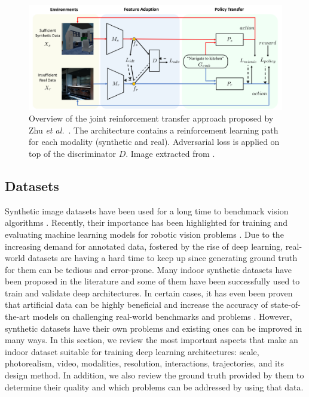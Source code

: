 \begin{figure}[!htb]
    \centering
    \includegraphics[width=\linewidth]{Figures/Sim2Real/jointlearning.png}
    \caption{Overview of the joint reinforcement transfer approach proposed by Zhu \emph{et al.}~\cite{Zhu2019}. The architecture contains a reinforcement learning path for each modality (synthetic and real). Adversarial loss is applied on top of the discriminator $D$. Image extracted from \cite{Zhu2019}.}
    \label{fig:sim2real:joint}
\end{figure}


\subsection{Datasets}

Synthetic image datasets have been used for a long time to benchmark vision algorithms \cite{Butler2012}. Recently, their importance has been highlighted for training and evaluating machine learning models for robotic vision problems \cite{Brodeur2017, Ros2016, Mahler2017dex}. Due to the increasing demand for annotated data, fostered by the rise of deep learning, real-world datasets are having a hard time to keep up since generating ground truth for them can be tedious and error-prone. Many indoor synthetic datasets have been proposed in the literature and some of them have been successfully used to train and validate deep architectures. In certain cases, it has even been proven that artificial data can be highly beneficial and increase the accuracy of state-of-the-art models on challenging real-world benchmarks and problems \cite{Shrivastava2017,Barbosa2018, Ros2016}. However, synthetic datasets have their own problems and existing ones can be improved in many ways. In this section, we review the most important aspects that make an indoor dataset suitable for training deep learning architectures: scale, photorealism, video, modalities, resolution, interactions, trajectories, and its design method. In addition, we also review the ground truth provided by them to determine their quality and which problems can be addressed by using that data.

